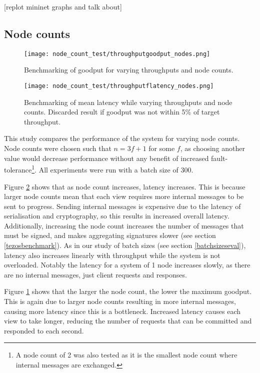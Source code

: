 [replot mininet graphs and talk about]

\subsection{Node counts} \label{nodecountseval}

\begin{figure}[h!]
\centering
\texttt{[image: node\_count\_test/throughputgoodput\_nodes.png]}
\caption{Benchmarking of goodput for varying throughputs and node counts.}
\label{throughputgoodputnodes}
\end{figure}

\begin{figure}[h!]
\centering
\texttt{[image: node\_count\_test/throughputflatency\_nodes.png]}
\caption{Benchmarking of mean latency while varying throughputs and node counts. Discarded result if goodput was not within 5\% of target throughput.}
\label{throughputlatencynodes}
\end{figure}

This study compares the performance of the system for varying node counts. Node counts were chosen such that $n = 3f + 1$ for some $f$, as choosing another value would decrease performance without any benefit of increased fault-tolerance\footnote{A node count of 2 was also tested as it is the smallest node count where internal messages are exchanged.}. All experiments were run with a batch size of 300.

Figure \ref{throughputlatencynodes} shows that as node count increases, latency increases. This is because larger node counts mean that each view requires more internal messages to be sent to progress. Sending internal messages is expensive due to the latency of serialisation and cryptography, so this results in increased overall latency. Additionally, increasing the node count increases the number of messages that must be signed, and makes aggregating signatures slower (see section \ref{tezosbenchmark}). As in our study of batch sizes (see section \ref{batchsizeseval}), latency also increases linearly with throughput while the system is not overloaded. Notably the latency for a system of 1 node increases slowly, as there are no internal messages, just client requests and responses.

Figure \ref{throughputgoodputnodes} shows that the larger the node count, the lower the maximum goodput. This is again due to larger node counts resulting in more internal messages, causing more latency since this is a bottleneck. Increased latency causes each view to take longer, reducing the number of requests that can be committed and responded to each second.

